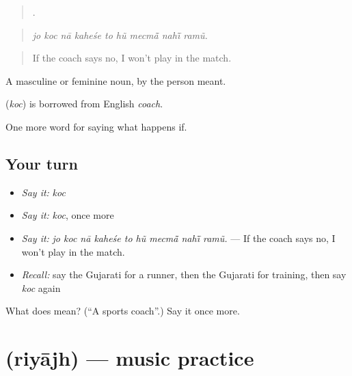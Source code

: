 \begin{quote}
        .
\end{quote}

\begin{quote}
\emph{jo koc nā kaheśe to hũ mecmā̃ nahī̃ ramũ.}
\end{quote}

\begin{quote}
If the coach says no, I won't play in the match.
\end{quote}

A masculine or feminine noun, by the person meant.

\begin{cousinweb}
\textbf{} (\emph{koc}) is borrowed from English \emph{coach}.
\end{cousinweb}

\begin{grammarlens}[title={What you've built}]
One more word for saying what happens if.
\end{grammarlens}

\subsection*{Your turn}
\begin{itemize}
\raggedright
  \item \emph{Say it:} \emph{koc}
  \item \emph{Say it:} \emph{koc}, once more
  \item \emph{Say it:} \emph{jo koc nā kaheśe to hũ mecmā̃ nahī̃ ramũ.} — If the coach says no, I won't play in the match.
  \item \emph{Recall:} say the Gujarati for a runner, then the Gujarati for training, then say \emph{koc} again
\end{itemize}

\begin{tcolorbox}[breakable,colback=teal!4,colframe=teal!35!black,title={Before you move on}]
What does  mean? (\textquotedblleft{}A sports coach\textquotedblright{}.) Say it once more.
\end{tcolorbox}
\section[\texorpdfstring{\gu{રિયાઝ} (riyājh)}{રિયાઝ (riyājh)}]{ (riyājh) — music practice}

\label{lesson:GU-C551-riyajh}



